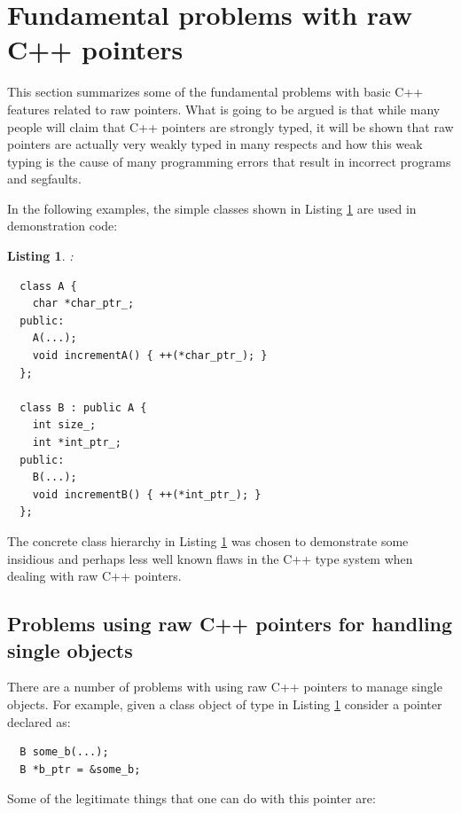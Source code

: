\documentclass[pdf,ps2pdf,11pt]{SANDreport}
\newtheorem{listing}{Listing}
\begin{document}
%
{}\section{Fundamental problems with raw C++ pointers}
\label{sec:problems-with-raw-pointers}
%

This section summarizes some of the fundamental problems with basic
C++ features related to raw pointers.  What is going to be argued is
that while many people will claim that C++ pointers are strongly
typed, it will be shown that raw pointers are actually very weakly
typed in many respects and how this weak typing is the cause of many
programming errors that result in incorrect programs and segfaults.

In the following examples, the simple classes shown in Listing
{}\ref{listing:Simple_A_B} are used in demonstration code:

\begin{listing}:\\
\label{listing:Simple_A_B}
{\small\begin{verbatim}
  class A {
    char *char_ptr_;
  public:
    A(...);
    void incrementA() { ++(*char_ptr_); }
  };

  class B : public A {
    int size_;
    int *int_ptr_;
  public:
    B(...);
    void incrementB() { ++(*int_ptr_); }
  };
\end{verbatim}}
\end{listing}

The concrete class hierarchy in Listing {}\ref{listing:Simple_A_B} was
chosen to demonstrate some insidious and perhaps less well known flaws
in the C++ type system when dealing with raw C++ pointers.


%
{}\subsection{Problems using raw C++ pointers for handling single objects}
%

There are a number of problems with using raw C++ pointers to manage
single objects.  For example, given a class object of type {}
in Listing {}\ref{listing:Simple_A_B} consider a pointer declared as:

{\small\begin{verbatim}
  B some_b(...);
  B *b_ptr = &some_b;
\end{verbatim}}

Some of the legitimate things that one can do with this pointer are:
\end{document}
